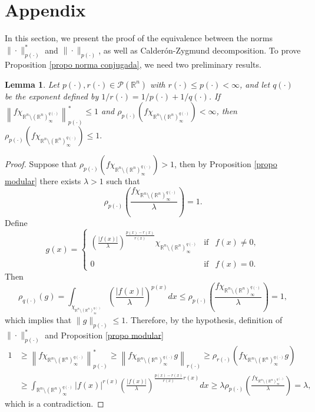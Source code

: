 \documentclass[a4paper,11pt,reqno]{amsart}
\theoremstyle{plain}
\numberwithin{equation}{section}
\newtheorem{lema}[teo]{Lemma}
\theoremstyle{definition}
\newcommand{\R}{{\mathbb{R}^n}}
\begin{document}
\section{Appendix}\label{sec 5} In this section, we present the proof of the equivalence between the norms $\|\cdot\|_{p(\cdot)}^*$ and $\|\cdot\|_{p(\cdot)}$, as well as Calderón-Zygmund decomposition. To prove Proposition \ref{propo norma conjugada}, we need two preliminary results.
\begin{lema}\label{lema acotación de la modular para q finito}
	Let ${p(\cdot)},{r(\cdot)}\in\mathcal{P}(\R)$ with $r(\cdot)\leq p(\cdot)<\infty$, and let ${q(\cdot)}$ be the exponent defined by $1/r(\cdot)=1/p(\cdot)+1/q(\cdot)$.	If $\left\|f\chi_{\R\setminus(\R)_\infty^{q(\cdot)}}\right\|^\ast_{p(\cdot)}\leq1$ and $\rho_{p(\cdot)}\left(f\chi_{\R\setminus(\R)_\infty^{q(\cdot)}}\right)<\infty$, then $\rho_{p(\cdot)}\left(f\chi_{\R\setminus(\R)_\infty^{q(\cdot)}}\right)\leq1.$	
\end{lema}
\begin{proof}
	Suppose that $\rho_{p(\cdot)}\left(f\chi_{\R\setminus(\R)_\infty^{q(\cdot)}}\right)>1$, then by Proposition \ref{propo modular} there exists $\lambda>1$ such that
	$$\rho_{p(\cdot)}\left(\frac{f\chi_{\R\setminus(\R)_\infty^{q(\cdot)}}}{\lambda}\right)=1.$$
	Define
	$$	 g(x)= \left\{ \begin{array}{lcc} \left(\frac{|f(x)|}{\lambda}\right)^\frac{p(x)-r(x)}{r(x)}\chi_{\R\setminus(\R)^{q(\cdot)}_\infty} & \text{if} & f(x)\neq0,  \\ \\ 0 & \text{if} & f(x)=0. \end{array} \right.$$  
	Then 
	\begin{equation*}
		\rho_{q(\cdot)}(g)=\int_{\chi_{\R\setminus(\R)^{q(\cdot)}_\infty}}\left(\frac{|f(x)|}{\lambda}\right)^{p(x)}dx\leq\rho_{p(\cdot)}\left(\frac{f\chi_{\R\setminus(\R)^{q(\cdot)}_\infty}}{\lambda}\right)=1,
	\end{equation*}
	which implies that $\|g\|_{p(\cdot)}\leq 1$. Therefore, by the hypothesis, definition of $\|\cdot\|^*_{p(\cdot)}$ and Proposition \ref{propo modular}
	\begin{align*}
		1&\geq\left\|f\chi_{\R\setminus(\R)_\infty^{q(\cdot)}}\right\|^\ast_{p(\cdot)}\geq\left\|f\chi_{\R\setminus(\R)_\infty^{q(\cdot)}}g\right\|_{r(\cdot)}
		\geq\rho_{r(\cdot)}\left(f\chi_{\R\setminus(\R)_\infty^{q(\cdot)} }g\right)\\
		&\geq\int_{\R\setminus(\R)_\infty^{q(\cdot)}}|f(x)|^{r(x)}\left(\frac{|f(x)|}{\lambda}\right)^{\frac{p(x)-r(x)}{r(x)}r(x)}dx\geq\lambda\rho_{p(\cdot)}\left(\frac{f\chi_{\R\setminus(\R)_\infty^{q(\cdot)}}}{\lambda}\right)=\lambda,
	\end{align*}
	which is a contradiction.
\end{proof}
\end{document}
